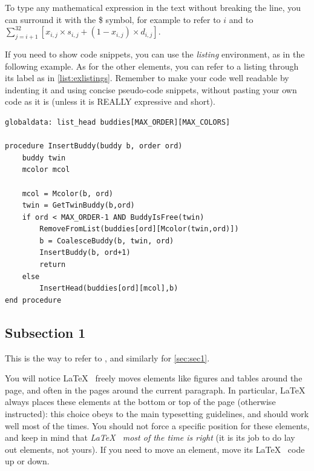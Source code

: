 \documentclass[12pt,oneside,a4paper]{article}
\begin{document}
To type any mathematical expression in the text without breaking the line, you can surround it with the \$ symbol, for example to refer to $i$ and to $ \sum_{j=i+1}^{32} [ x_{i,j} \times s_{i,j} + (1 - x_{i,j}) \times d_{i,j} ] $.

If you need to show code snippets, you can use the \emph{listing} environment, as in the following example. As for the other elements, you can refer to a listing through its label as in \cref{list:exlistings}. Remember to make your code well readable by indenting it and using concise pseudo-code snippets, without pasting your own code as it is (unless it is REALLY expressive and short).

\begin{lstlisting}[label={list:exlistings},caption={Example of code snippet}]
globaldata: list_head buddies[MAX_ORDER][MAX_COLORS]

procedure InsertBuddy(buddy b, order ord)
	buddy twin
	mcolor mcol
	
	mcol = Mcolor(b, ord)
	twin = GetTwinBuddy(b,ord)	
	if ord < MAX_ORDER-1 AND BuddyIsFree(twin)
		RemoveFromList(buddies[ord][Mcolor(twin,ord)])
		b = CoalesceBuddy(b, twin, ord)
		InsertBuddy(b, ord+1)
		return
	else
		InsertHead(buddies[ord][mcol],b)
end procedure
\end{lstlisting}

\subsection{Subsection 1} \label{sec:sub1}
This is the way to refer to , and similarly for \cref{sec:sec1}.

You will notice \LaTeX~ freely moves elements like figures and tables around the page, and often in the pages around the current paragraph. In particular, \LaTeX~ always places these elements at the bottom or top of the page (otherwise instructed): this choice obeys to the main typesetting guidelines, and should work well most of the times. You should not force a specific position for these elements, and keep in mind that \textit{\LaTeX~ most of the time is right} (it is its job to do lay out elements, not yours). If you need to move an element, move its \LaTeX~ code up or down.
\end{document}
